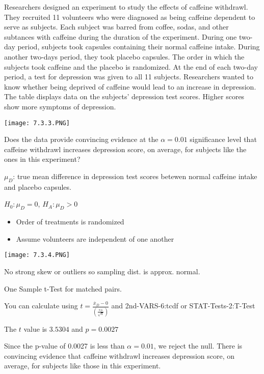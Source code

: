 \documentclass[../stats.tex]{subfiles}
\begin{document}
\pagebreak
\begin{example}
    Researchers designed an experiment to study the effects of caffeine withdrawl. They recruited 11 volunteers who were diagnosed as being caffeine dependent to serve as subjects. Each subject was barred from coffee, sodas, and other subtances 
    with caffeine during the duration of the experiment. During one two-day period, subjects took capsules containing their normal caffeine intake. During another two-days period, they took placebo capsules. The order in which the subjects took caffeine and the placebo is randomized.
    At the end of each two-day period, a test for depression was given to all 11 subjects. Researchers wanted to know whether being deprived of caffeine would lead to an increase in depression. The table displays data on the subjects' depression test scores. Higher scores show more symptoms of depression.

    \begin{center}
        \texttt{[image: 7.3.3.PNG]}
    \end{center}

    Does the data provide convincing evidence at the $\alpha=0.01$ significance level that caffeine withdrawl increases depression score, on average, for subjects like the ones in this experiment?

    $\mu_D$: true mean difference in depression test scores betewen normal caffeine intake and placebo capsules.

    $H_0: \mu_D = 0$, $H_A: \mu_D>0$

    \begin{itemize}
        \item Order of treatments is randomized 
        \item Assume volunteers are independent of one another 
    \end{itemize}
    \begin{center}
        \texttt{[image: 7.3.4.PNG]}
    \end{center}
    No strong skew or outliers so sampling dist. is approx. normal.

    One Sample t-Test for matched pairs.

    You can calculate using $t=\frac{\overline{x}_D-0}{\left(\frac{s_D}{\sqrt{n}}\right)}$ and 2nd-VARS-6:tcdf or STAT-Tests-2:T-Test 

    The $t$ value is $3.5304$ and $p=0.0027$

    Since the p-value of 0.0027 is less than $\alpha=0.01$, we reject the null. There is convincing evidence that caffeine withdrawl increases depression score, on average, for subjects like those in this experiment.
\end{example}
\end{document}
